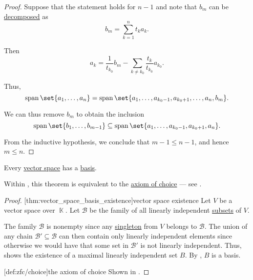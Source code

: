 \begin{proof}
  Suppose that the statement holds for \( n - 1 \) and note that \( b_m \) can be \hyperref[def:basis_decomposition]{decomposed} as
  \begin{equation*}
    b_m = \sum_{k=1}^n t_k a_k.
  \end{equation*}

  Then
  \begin{equation*}
    a_k = \frac 1 {t_{k_0}} b_m - \sum_{k \neq k_0} \frac {t_k} {t_{k_0}} a_{k_0}.
  \end{equation*}

  Thus,
  \begin{equation*}
    \linspan\set{ a_1, \ldots, a_n } = \linspan\set{ a_1, \ldots, a_{k_0 - 1}, a_{k_0 + 1}, \ldots, a_n, b_m }.
  \end{equation*}

  We can thus remove \( b_m \) to obtain the inclusion
  \begin{equation*}
    \linspan\set{ b_1, \ldots, b_{m-1} } \subseteq \linspan\set{ a_1, \ldots, a_{k_0 - 1}, a_{k_0 + 1}, a_n }.
  \end{equation*}

  From the inductive hypothesis, we conclude that \( m - 1 \leq n - 1 \), and hence \( m \leq n \).
\end{proof}

\begin{theorem}\label{thm:vector_space_basis_existence}
  Every \hyperref[def:vector_space]{vector space} has a \hyperref[def:hamel_basis]{basis}.

  Within \hyperref[def:zfc]{}, this theorem is equivalent to the \hyperref[def:zfc/choice]{axiom of choice} --- see .
\end{theorem}
\begin{proof}
  [thm:vector_space_basis_existence]{vector space existence} Let \( V \) be a vector space over \( \BbbK \). Let \( \mathcal{B} \) be the family of all linearly independent \hyperref[rem:linear_combinations]{subsets} of \( V \).

  The family \( \mathcal{B} \) is nonempty since any \hyperref[rem:singleton_sets]{singleton} from \( V \) belongs to \( \mathcal{B} \). The union of any chain \( \mathcal{B}' \subseteq \mathcal{B} \) can then contain only linearly independent elements since otherwise we would have that some set in \( \mathcal{B}' \) is not linearly independent. Thus,  shows the existence of a maximal linearly independent set \( B \). By , \( B \) is a basis.

  [def:zfc/choice]{the axiom of choice} Shown in \cite{Blass1984}.
\end{proof}

